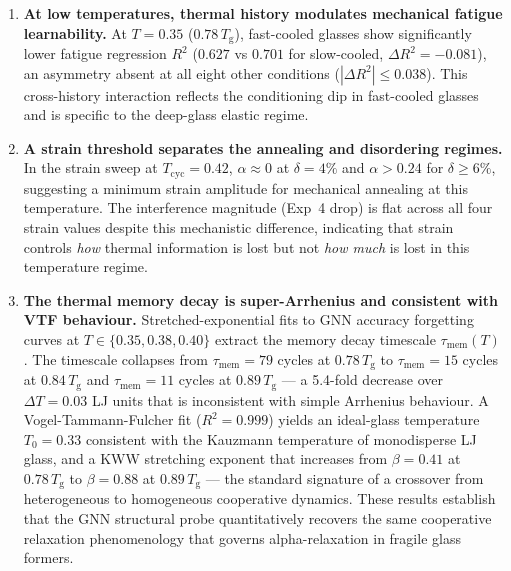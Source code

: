 \documentclass[12pt,a4paper]{article}
\newcommand{\Tg}{T_{\mathrm{g}}}
\newcommand{\Tbat}{T_{\mathrm{cyc}}}
\newcommand{\vtau}{\tau_{\mathrm{mem}}}
\newcommand{\Tzero}{T_0}
\begin{document}
\begin{enumerate}
  \item \textbf{At low temperatures, thermal history modulates mechanical fatigue learnability.} At $T = 0.35$ ($0.78\,\Tg$), fast-cooled glasses show significantly lower fatigue regression $R^2$ ($0.627$ vs $0.701$ for slow-cooled, $\Delta R^2 = -0.081$), an asymmetry absent at all eight other conditions ($|\Delta R^2| \leq 0.038$). This cross-history interaction reflects the conditioning dip in fast-cooled glasses and is specific to the deep-glass elastic regime.
  
  
  \item \textbf{A strain threshold separates the annealing and disordering regimes.}
  In the strain sweep at $\Tbat = 0.42$, $\alpha \approx 0$ at $\delta = 4\%$ and $\alpha > 0.24$ for $\delta \geq 6\%$, suggesting a minimum strain amplitude for mechanical annealing at this temperature.
  The interference magnitude (Exp~4 drop) is flat across all four strain values despite this mechanistic difference, indicating that strain controls \emph{how} thermal information is lost but not \emph{how much} is lost in this temperature regime.

  \item \textbf{The thermal memory decay is super-Arrhenius and consistent with VTF behaviour.}
  Stretched-exponential fits to GNN accuracy forgetting curves at $T \in \{0.35, 0.38, 0.40\}$ extract the memory decay timescale $\vtau(T)$.
  The timescale collapses from $\vtau = 79$ cycles at $0.78\,\Tg$ to $\vtau = 15$ cycles at $0.84\,\Tg$ and $\vtau = 11$ cycles at $0.89\,\Tg$ — a 5.4-fold decrease over $\Delta T = 0.03$ LJ units that is inconsistent with simple Arrhenius behaviour.
  A Vogel-Tammann-Fulcher fit ($R^2 = 0.999$) yields an ideal-glass temperature $\Tzero = 0.33$ consistent with the Kauzmann temperature of monodisperse LJ glass, and a KWW stretching exponent that increases from $\beta = 0.41$ at $0.78\,\Tg$ to $\beta = 0.88$ at $0.89\,\Tg$ — the standard signature of a crossover from heterogeneous to homogeneous cooperative dynamics.
  These results establish that the GNN structural probe quantitatively recovers the same cooperative relaxation phenomenology that governs alpha-relaxation in fragile glass formers.
 
\end{enumerate}
 
\end{document}
